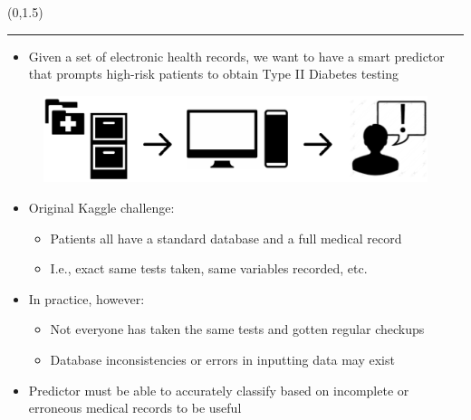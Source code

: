 \documentclass[a0]{a0poster}
\def\Head#1{\noindent{\LARGE\color{bluegray} #1}\bigskip}
\begin{document}
\begin{textblock}{7.0}(0,1.5)

\hrule\medskip
\Head{Introduction}

\begin{itemize}
  
  \item Given a set of electronic health records, we want to have a smart predictor that prompts high-risk patients to obtain Type II Diabetes testing

\end{itemize}

\begin{figure}[!h]
  \centering
  \includegraphics[width=9in]{intro-fig.pdf}
  \label{fig1}
\end{figure}

\begin{multicols}{2}
  
  \begin{itemize}
    \item Original Kaggle challenge:
    \begin{itemize}
      \item Patients all have a standard database and a full medical record
      \item I.e., exact same tests taken, same variables recorded, etc.
    \end{itemize}

    \item In practice, however:
    \begin{itemize}
      \item Not everyone has taken the same tests and gotten regular checkups
      \item Database inconsistencies or errors in inputting data may exist
    \end{itemize}
  \end{itemize}
\end{multicols}

\begin{itemize}

  \item Predictor must be able to accurately classify based on incomplete or erroneous medical records to be useful


\end{itemize}
\end{textblock}
\end{document}
